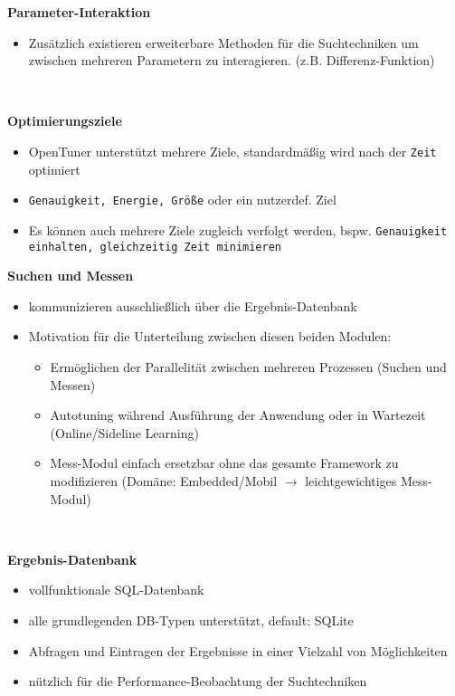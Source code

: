  \begin{frame}
  \textbf{Parameter-Interaktion}
    \begin{itemize}
      \item Zusätzlich existieren erweiterbare Methoden für die Suchtechniken um zwischen mehreren Parametern 
    zu interagieren. (z.B. Differenz-Funktion)
    \end{itemize}
    
    \textbf{\\}
  
  \textbf{Optimierungsziele}
    \begin{itemize}
      \item OpenTuner unterstützt mehrere Ziele, standardmäßig wird nach der \texttt{Zeit} optimiert
      \item \texttt{Genauigkeit, Energie, Größe} oder ein nutzerdef. Ziel
      \item Es können auch mehrere Ziele zugleich verfolgt werden, bspw. \texttt{Genauigkeit einhalten, gleichzeitig
      Zeit minimieren}
    \end{itemize}
  \end{frame}
  
  \begin{frame}
    \textbf{Suchen und Messen}
    \begin{itemize}
      \item kommunizieren ausschließlich über die Ergebnis-Datenbank
      \item Motivation für die Unterteilung zwischen diesen beiden Modulen:
      \begin{itemize}
        \item Ermöglichen der Parallelität zwischen mehreren Prozessen (Suchen und Messen)
        \item Autotuning während Ausführung der Anwendung oder in Wartezeit (Online/Sideline Learning)
        \item Mess-Modul einfach ersetzbar ohne das gesamte Framework zu modifizieren (Domäne: Embedded/Mobil
        $\rightarrow$ leichtgewichtiges Mess-Modul)
      \end{itemize}
    \end{itemize} 
    
  \textbf{\\}
  
  \textbf{Ergebnis-Datenbank}
    \begin{itemize}
      \item vollfunktionale SQL-Datenbank
      \item alle grundlegenden DB-Typen unterstützt, default: SQLite 
      \item Abfragen und Eintragen der Ergebnisse in einer Vielzahl von Möglichkeiten
      \item nützlich für die Performance-Beobachtung der Suchtechniken
    \end{itemize}
  \end{frame}
  
